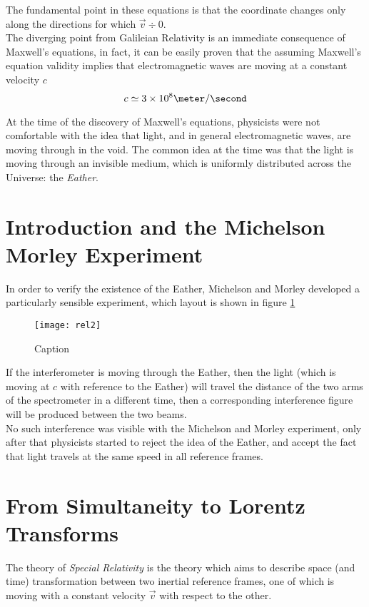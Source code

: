 The fundamental point in these equations is that the coordinate changes only along the directions for which $\vec{v}\div0$.\\

The diverging point from Galileian Relativity is an immediate consequence of Maxwell's equations, in fact, it can be easily proven that the assuming Maxwell's equation validity implies that electromagnetic waves are moving at a constant velocity $c$
\[c\simeq3\times10^8 \meter / \second\]

At the time of the discovery of Maxwell's equations, physicists were not comfortable with the idea that light, and in general electromagnetic waves, are moving through in the void. The common idea at the time was that the light is moving through an invisible medium, which is uniformly distributed across the Universe: the \emph{Eather}.


\section{Introduction and the Michelson Morley Experiment}
In order to verify the existence of the Eather, Michelson and Morley developed a particularly sensible experiment, which layout is shown in figure \ref{fig:rel2}

\begin{figure}
    \centering
    \texttt{[image: rel2]}
    \caption{Caption}
    \label{fig:rel2}
\end{figure}{}


If the interferometer is moving through the Eather, then the light (which is moving at $c$ with reference to the Eather) will travel the distance of the two arms of the spectrometer in a different time, then a corresponding interference figure will be produced between the two beams.\\

No such interference was visible with the Michelson and Morley experiment, only after that physicists started to reject the idea of the Eather, and accept the fact that light travels at the same speed in all reference frames.





\section{From Simultaneity to Lorentz Transforms}
The theory of \emph{Special Relativity} is the theory which aims to describe space (and time) transformation between two inertial reference frames, one of which is moving with a constant velocity $\vec{v}$ with respect to the other.\\

